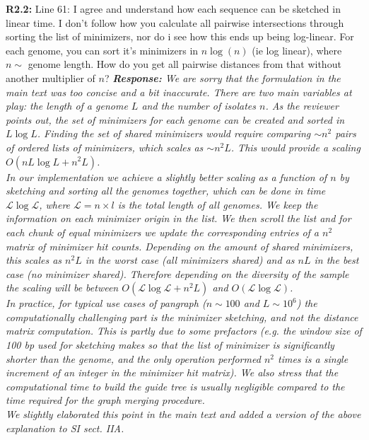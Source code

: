 \documentclass[aps,rmp,onecolumn]{revtex4-1}
\newcommand{\Marco}[1]{{\color{orange}Marco: #1}}
\newcommand{\Liam}[1]{{\color{teal}Liam: #1}}
\newcommand{\reviewer}[2]{\textbf{#1:} #2\vskip 5mm}
\newcommand{\response}[1]{{\it {\color{response}\textbf{Response:} #1}}\vskip 5mm}
\newcommand{\SIalgo}{II}
\begin{document}
\reviewer{R2.2}{Line 61: I agree and understand how each sequence can be sketched in linear time. I don't follow how you calculate all pairwise intersections through sorting the list of minimizers, nor do i see how this ends up being log-linear. For each genome, you can sort it's minimizers in $n \log (n)$ (ie log linear), where $n \sim$ genome length. How do you get all pairwise distances from that without another multiplier of $n$?}
\response{ We are sorry that the formulation in the main text was too concise and a bit inaccurate.
There are two main variables at play: the length of a genome $L$ and the number of isolates $n$. 
As the reviewer points out, the set of minimizers for each genome can be created and sorted in $L \log L$. 
Finding the set of shared minimizers would require comparing $\sim n^2$ pairs of ordered lists of minimizers, which scales as $\sim n^2 L$. This would provide a scaling $O(n L \log L + n^2 L)$.\\
In our implementation we achieve a slightly better scaling as a function of $n$ by sketching and sorting all the genomes together, which can be done in time $\mathcal{L} \log \mathcal{L}$, where $\mathcal{L}= n \times l$ is the total length of all genomes. 
We keep the information on each minimizer origin in the list. We then scroll the list and for each chunk of equal minimizers we update the corresponding entries of a $n^2$ matrix of minimizer hit counts. 
Depending on the amount of shared minimizers, this scales as $n^2 L$ in the worst case (all minimizers shared) and as $n L$ in the best case (no minimizer shared). 
Therefore depending on the diversity of the sample the scaling will be between $O(\mathcal{L} \log \mathcal{L} + n^2 L)$ and $O(\mathcal{L} \log \mathcal{L})$.\\
In practice, for typical use cases of pangraph ($n \sim 100$ and $L \sim 10^6$) the computationally challenging part is the minimizer sketching, and not the distance matrix computation. This is partly due to some prefactors (e.g. the window size of 100 bp used for sketching makes so that the list of minimizer is significantly shorter than the genome, and the only operation performed $n^2$ times is a single increment of an integer in the minimizer hit matrix). We also stress that the computational time to build the guide tree is usually negligible compared to the time required for the graph merging procedure.\\
We slightly elaborated this point in the main text and added a version of the above explanation to SI sect. {\SIalgo}A.
}
\end{document}
